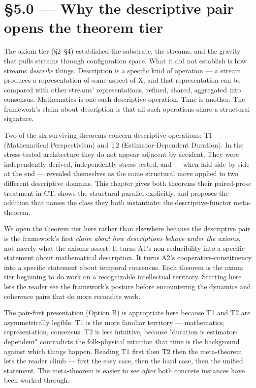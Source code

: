\documentclass[11pt, openany]{book}
\newcommand{\sectionbreak}{\clearpage}
\begin{document}
\sectionbreak

\section{§5.0 --- Why the descriptive pair opens the theorem tier}

The axiom tier (§2–§4) established the substrate, the streams, and the gravity that pulls streams through configuration space. What it did not establish is how streams \textit{describe} things. Description is a specific kind of operation --- a stream produces a representation of some aspect of X, and that representation can be compared with other streams' representations, refined, shared, aggregated into consensus. Mathematics is one such descriptive operation. Time is another. The framework's claim about description is that all such operations share a structural signature.

Two of the six surviving theorems concern descriptive operations: T1 (Mathematical Perspectivism) and T2 (Estimator-Dependent Duration). In the stress-tested architecture they do not appear adjacent by accident. They were independently derived, independently stress-tested, and --- when laid side by side at the end --- revealed themselves as the same structural move applied to two different descriptive domains. This chapter gives both theorems their paired-prose treatment in CT, shows the structural parallel explicitly, and proposes the addition that names the class they both instantiate: the descriptive-functor meta-theorem.

We open the theorem tier here rather than elsewhere because the descriptive pair is the framework's first \textit{claim about how descriptions behave under the axioms}, not merely what the axioms assert. It turns A1's non-reducibility into a specific statement about mathematical description. It turns A2's cooperative-constituency into a specific statement about temporal consensus. Each theorem is the axiom tier beginning to do work on a recognizable intellectual territory. Starting here lets the reader see the framework's posture before encountering the dynamics and coherence pairs that do more recondite work.

The pair-first presentation (Option B) is appropriate here because T1 and T2 are asymmetrically legible. T1 is the more familiar territory --- mathematics, representation, consensus. T2 is less intuitive, because "duration is estimator-dependent" contradicts the folk-physical intuition that time is the background against which things happen. Reading T1 first then T2 then the meta-theorem lets the reader climb --- first the easy case, then the hard case, then the unified statement. The meta-theorem is easier to see \textit{after} both concrete instances have been worked through.
\end{document}
